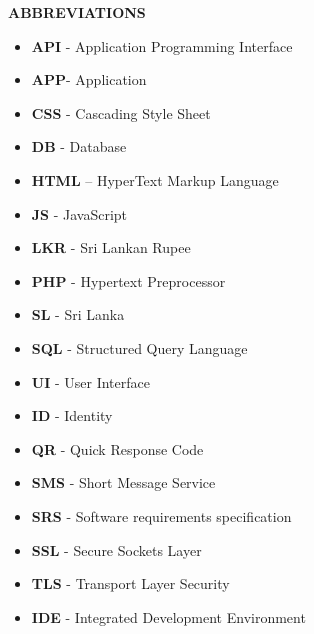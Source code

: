 \textbf{ABBREVIATIONS}

\begin{itemize}[label={}]

\item \textbf{API} - Application Programming Interface

\item \textbf{APP}- Application

\item \textbf{CSS} - Cascading Style Sheet

\item \textbf{DB} - Database

\item \textbf{HTML} -- HyperText Markup Language

\item \textbf{JS} - JavaScript

\item \textbf{LKR} - Sri Lankan Rupee

\item \textbf{PHP} - Hypertext Preprocessor

\item \textbf{SL} - Sri Lanka

\item \textbf{SQL} - Structured Query Language

\item \textbf{UI} - User Interface

\item \textbf{ID} - Identity

\item \textbf{QR} - Quick Response Code

\item \textbf{SMS} - Short Message Service

\item \textbf{SRS} - Software requirements specification

\item \textbf{SSL} - Secure Sockets Layer

\item \textbf{TLS} - Transport Layer Security

\item \textbf{IDE} - Integrated Development Environment

\end{itemize}
